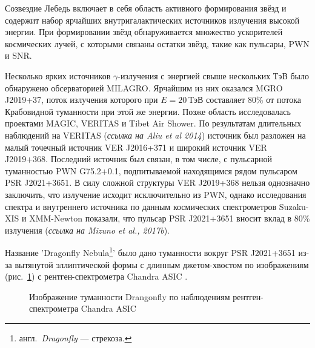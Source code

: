 \documentclass[magd,floatypics,numeref]{msudipl} %
\begin{document}
Созвездие Лебедь включает в себя область активного формирования звёзд и содержит набор ярчайших внутригалактических источников излучения высокой энергии. При формировании звёзд обнаруживается множество ускорителей космических лучей, с которыми связаны остатки звёзд, такие как пульсары, PWN и SNR. 

Несколько ярких источников $\gamma$-излучения с энергией свыше нескольких ТэВ было обнаружено обсерваторией MILAGRO. Ярчайшим из них оказался MGRO J2019+37, поток излучения которого при $E=20~\text{ТэВ}$ составляет 80\% от потока Крабовидной туманности при этой же энергии. Позже область исследовалась проектами MAGIC, VERITAS и Tibet Air Shower. По результатам длительных  наблюдений на VERITAS (\textit{ссылка на Aliu et al 2014}) источник был разложен на малый точечный источник VER J2016+371 и широкий источник VER J2019+368. Последний источник был связан, в том числе, с пульсарной туманностью PWN G75.2+0.1, подпитываемой находящимся рядом пульсаром PSR J2021+3651. В силу сложной структуры VER J2019+368 нельзя однозначно заключить, что излучение исходит исключительно из PWN, однако исследования спектра и внутреннего источника  по данным космических спектрометров Suzaku-XIS и XMM-Newton показали, что пульсар PSR J2021+3651 вносит вклад в 80\% излучения (\textit{ссылка на Mizuno et al., 2017b}). 

Название 'Dragonfly Nebula\footnote{англ.~\textit{Dragonfly} --- стрекоза.}' было дано туманности вокруг PSR J2021+3651 из-за вытянутой эллиптической формы с длинным джетом-хвостом по изображениям (рис.~\ref{pic:DFImage}\afterpage{\clearpage}) с рентген-спектрометра Chandra ASIC \cite{van2008rings}. 
\begin{figure}[b]
	\noindent{}
	\caption{Изображение туманности Drangonfly по наблюдениям рентген-спектрометра Chandra ASIC}
	\label{pic:DFImage}
\end{figure}
\end{document}
